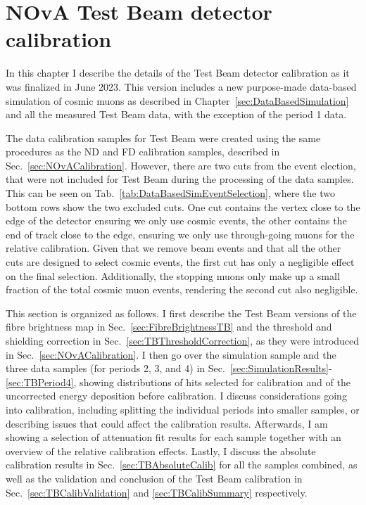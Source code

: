 \chapter{NOvA Test Beam detector calibration}\label{sec:TBCalibrationSection}

In this chapter I describe the details of the Test Beam detector calibration as it was finalized in June 2023. This version includes a new purpose-made data-based simulation of cosmic muons as described in Chapter~\ref{sec:DataBasedSimulation} and all the measured Test Beam data, with the exception of the period 1 data.

The data calibration samples for Test Beam were created using the same procedures as the \gls{ND} and \gls{FD} calibration samples, described in Sec.~\ref{sec:NOvACalibration}. However, there are two cuts from the event election, that were not included for Test Beam during the processing of the data samples. This can be seen on Tab.~\ref{tab:DataBasedSimEventSelection}, where the two bottom rows show the two excluded cuts. One cut contains the vertex close to the edge of the detector ensuring we only use cosmic events, the other contains the end of track close to the edge, ensuring we only use through-going muons for the relative calibration. Given that we remove beam events and that all the other cuts are designed to select cosmic events, the first cut has only a negligible effect on the final selection. Additionally, the stopping muons only make up a small fraction of the total cosmic muon events, rendering the second cut also negligible.

This section is organized as follows. I first describe the Test Beam versions of the fibre brightness map in Sec.~\ref{sec:FibreBrightnessTB} and the threshold and shielding correction in Sec.~\ref{sec:TBThresholdCorrection}, as they were introduced in Sec.~\ref{sec:NOvACalibration}. I then go over the simulation sample and the three data samples (for periods 2, 3, and 4) in Sec.~\ref{sec:SimulationResults}-\ref{sec:TBPeriod4}, showing distributions of hits selected for calibration and of the uncorrected energy deposition before calibration. I discuss considerations going into calibration, including splitting the individual periods into smaller samples, or describing issues that could affect the calibration results.  Afterwards, I am showing a selection of attenuation fit results for each sample together with an overview of the relative calibration effects. Lastly, I discuss the absolute calibration results in Sec.~\ref{sec:TBAbsoluteCalib} for all the samples combined, as well as the validation and conclusion of the Test Beam calibration in Sec.~\ref{sec:TBCalibValidation} and \ref{sec:TBCalibSummary} respectively.

